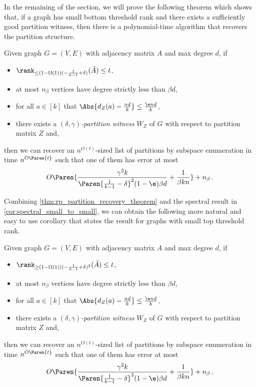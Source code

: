In the remaining of the section, we will prove the following theorem which shows that, if a graph has small bottom threshold rank and there exists a sufficiently good partition witness, then there is a polynomial-time algorithm that recovers the partition structure.

\begin{theorem}
\label{thm:rp_partition_recovery_theorem}
    Given graph $G=(V, E)$ with adjacency matrix $A$ and max degree $d$, if
    \begin{itemize}
        \item $\rank_{\leq (1-\Omega(1))(- \frac{1}{k-1} + \delta)}(\tilde{A})  \leq t$,
        \item at most $n_{\beta}$ vertices have degree strictly less than $\beta d$,
        \item for all $a\in[k]$ that $\Abs{d_Z(a) - \frac{nd}{k}}\leq \frac{\e nd}{k}$,
        \item there exists a \emph{$(\delta, \gamma)$-partition witness} $W_Z$ of $G$ with respect to partition matrix $Z$ and,
    \end{itemize}
    then we can recover an $n^{O(t)}$-sized list of partitions by subspace enumeration in time $n^{O\Paren{t}}$ such that one of them has error at most
    $$O \Paren{\frac{\gamma^2 k}{\Paren{\frac{1}{k-1} - \delta}^2 (1-\e) \beta d} + \frac{1}{\beta k n}} + n_{\beta}\,.$$
\end{theorem}

Combining \cref{thm:rp_partition_recovery_theorem} and the spectral result in \cref{cor:spectral_small_to_small}, we can obtain the following more natural and easy to use corollary that states the result for graphs with small top threshold rank.

\begin{corollary}
\label{cor:rp_partition_recovery_theorem}
        Given graph $G=(V, E)$ with adjacency matrix $A$ and max degree $d$, if
        \begin{itemize}
            \item $\rank_{\geq (1-\Omega(1))(- \frac{1}{k-1} + \delta)^2}(\tilde{A})  \leq t$,
            \item at most $n_{\beta}$ vertices have degree strictly less than $\beta d$,
            \item for all $a\in[k]$ that $\Abs{d_Z(a) - \frac{nd}{k}}\leq \frac{\e nd}{k}$,
            \item there exists a \emph{$(\delta, \gamma)$-partition witness} $W_Z$ of $G$ with respect to partition matrix $Z$ and,
        \end{itemize}
        then we can recover an $n^{O(t)}$-sized list of partitions by subspace enumeration in time $n^{O\Paren{t}}$ such that one of them has error at most
        $$O \Paren{\frac{\gamma^2 k}{\Paren{\frac{1}{k-1} - \delta}^2 (1-\e) \beta d} + \frac{1}{\beta k n}} + n_{\beta}\,.$$
\end{corollary}

